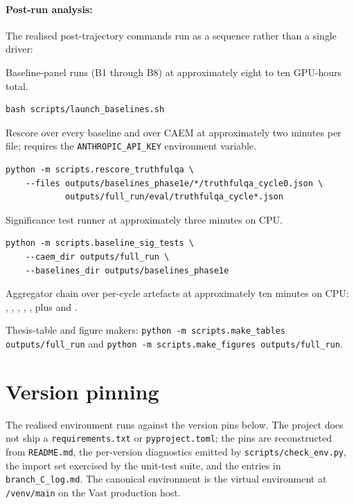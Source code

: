 \paragraph{Post-run analysis:} The realised post-trajectory commands run as a sequence rather than a single driver:
\begin{description}[style=nextline,leftmargin=0pt]
\item[Baselines.] Baseline-panel runs (B1 through B8) at approximately eight to ten GPU-hours total.
\begin{verbatim}
bash scripts/launch_baselines.sh
\end{verbatim}
\item[TruthfulQA Haiku rescore.] Rescore over every baseline and over CAEM at approximately two minutes per file; requires the \texttt{ANTHROPIC\_API\_KEY} environment variable.
\begin{verbatim}
python -m scripts.rescore_truthfulqa \
    --files outputs/baselines_phase1e/*/truthfulqa_cycle0.json \
            outputs/full_run/eval/truthfulqa_cycle*.json
\end{verbatim}
\item[Significance tests.] Significance test runner at approximately three minutes on CPU.
\begin{verbatim}
python -m scripts.baseline_sig_tests \
    --caem_dir outputs/full_run \
    --baselines_dir outputs/baselines_phase1e
\end{verbatim}
\item[Aggregators.] Aggregator chain over per-cycle artefacts at approximately ten minutes on CPU: , , , , , plus  and .
\item[Tables and figures.] Thesis-table and figure makers: \texttt{python -m scripts.make\_tables outputs/full\_run} and \texttt{python -m scripts.make\_figures outputs/full\_run}.
\end{description}

\section{Version pinning}
\label{app:repro-versions}

The realised environment runs against the version pins below. The project does not ship a \verb|requirements.txt| or \verb|pyproject.toml|; the pins are reconstructed from \verb|README.md|, the per-version diagnostics emitted by \verb|scripts/check_env.py|, the import set exercised by the unit-test suite, and the entries in \verb|branch_C_log.md|. The canonical environment is the virtual environment at \verb|/venv/main| on the Vast production host.

